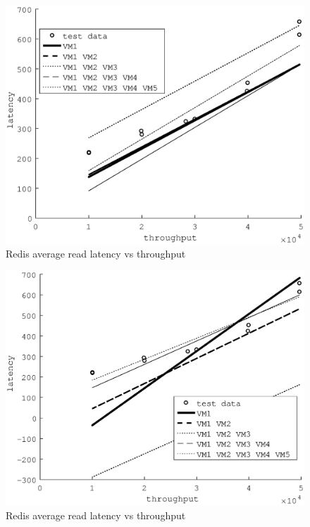 \documentclass{acm_proc_article-sp}
\begin{document}
\begin{figure}
\centering
\includegraphics[scale = 0.5]{fit_read_avg_latency_r3_x_r3_2x_m3_x_r3__m3_2x_m3_.eps}
\caption{Redis average read latency vs throughput}
\label{figure:redisbarread}
\end{figure}

\begin{figure}
\centering
\includegraphics[scale = 0.5]{fit_read_avg_latency_r3__r3_x_m3__m3_2x_r3_2x_m3_x.eps}
\caption{Redis average read latency vs throughput}
\label{figure:redisbarread}
\end{figure}
\end{document}

